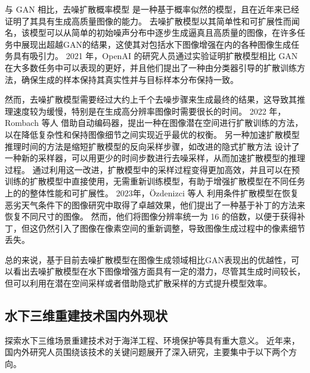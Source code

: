 与 GAN 相比，去噪扩散概率模型 \cite{pre_ddpm}\cite{ddpm}是一种基于概率似然的模型，且在近年来已经证明了其具有生成高质量图像的能力。
去噪扩散模型以其简单性和可扩展性而闻名，该模型可以从简单的初始噪声分布中逐步生成逼真且高质量的图像，在许多任务中展现出超越GAN的结果，这使其对包括水下图像增强在内的各种图像生成任务具有吸引力。
2021 年，OpenAI 的研究人员通过实验证明扩散模型相比 GAN 在大多数任务中可以表现的更好，并且他们提出了一种由分类器引导的扩散训练方法\cite{ddpm_beat_gan}，确保生成的样本保持其真实性并与目标样本分布保持一致。

然而，去噪扩散模型需要经过大约上千个去噪步骤来生成最终的结果，这导致其推理速度较为缓慢，特别是在生成高分辨率图像时需要很长的时间。
2022 年，Rombach 等人 \cite{latent}借助自动编码器，提出一种在图像潜在空间进行扩散训练的方法，以在降低复杂性和保持图像细节之间实现近乎最优的权衡。
另一种加速扩散模型推理时间的方法是缩短扩散模型的反向采样步骤，如改进的隐式扩散方法 \cite{improved_ddpm,ddim}设计了一种新的采样器，可以用更少的时间步数进行去噪采样，从而加速扩散模型的推理过程。
通过利用这一改进，扩散模型中的采样过程变得更加高效，并且可以在预训练的扩散模型中直接使用，无需重新训练模型，有助于增强扩散模型在不同任务上的的整体性能和可扩展性。
2023年，Özdenizci 等人 \cite{weather}利用条件扩散模型在恢复恶劣天气条件下的图像研究中取得了卓越效果，他们提出了一种基于补丁的方法来恢复不同尺寸的图像。
然而，他们将图像分辨率统一为 16 的倍数，以便于获得补丁，但这仍然引入了图像在像素空间的重新调整，导致图像生成过程中的像素细节丢失。

总的来说，基于目前去噪扩散模型在图像生成领域相比GAN表现出的优越性，可以看出去噪扩散模型在水下图像增强方面具有一定的潜力，尽管其生成时间较长，但可以利用在潜在空间采样或者借助隐式扩散采样的方式提升模型效率。

\subsection{水下三维重建技术国内外现状}
探索水下三维场景重建技术对于海洋工程、环境保护等具有重大意义。
近年来，国内外研究人员围绕该技术的关键问题展开了深入研究，主要集中于以下两个方向。

